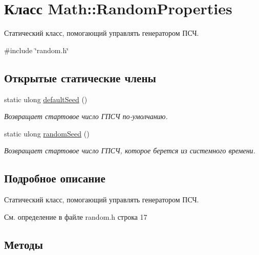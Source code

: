 \hypertarget{class_math_1_1_random_properties}{}\section{Класс Math\+:\+:Random\+Properties}
\label{class_math_1_1_random_properties}


Статический класс, помогающий управлять генератором ПСЧ.  




{\ttfamily \#include \char`\"{}random.\+h\char`\"{}}

\subsection*{Открытые статические члены}
\begin{DoxyCompactItemize}
\item 
static ulong \hyperlink{class_math_1_1_random_properties_a8c37bfae29a4b0d5c012532445dd5d6f}{default\+Seed} ()
\begin{DoxyCompactList}\small\item\em Возвращает стартовое число ГПСЧ по-\/умолчанию. \end{DoxyCompactList}\item 
static ulong \hyperlink{class_math_1_1_random_properties_a94bd24abcba2d281ea50dce34a0a9ac4}{random\+Seed} ()
\begin{DoxyCompactList}\small\item\em Возвращает стартовое число ГПСЧ, которое берется из системного времени. \end{DoxyCompactList}\end{DoxyCompactItemize}


\subsection{Подробное описание}
Статический класс, помогающий управлять генератором ПСЧ. 

См. определение в файле random.\+h строка 17



\subsection{Методы}
\hypertarget{class_math_1_1_random_properties_a8c37bfae29a4b0d5c012532445dd5d6f}{}\label{class_math_1_1_random_properties_a8c37bfae29a4b0d5c012532445dd5d6f} 
